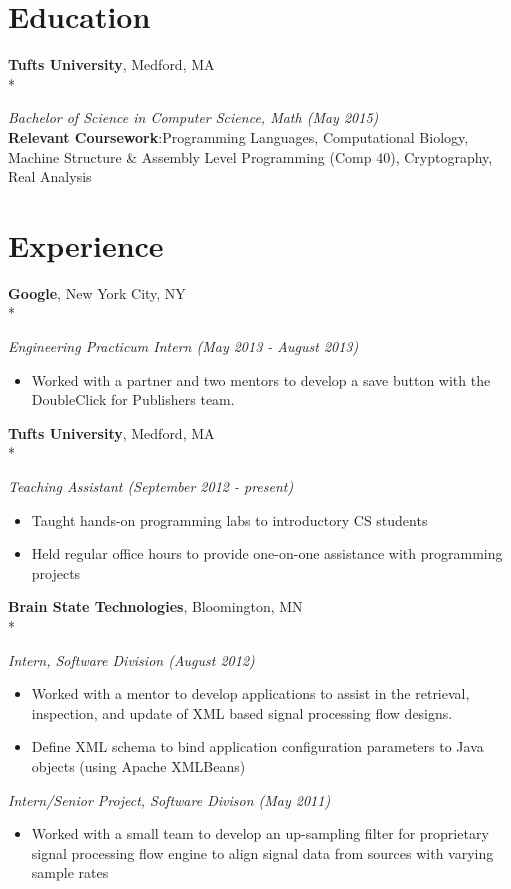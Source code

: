 \documentclass{article}
\newcommand{\position}[2]{
  \textit{#1 (#2)}
}
\newcommand{\affiliation}[2]{
  \textbf{#1}, #2 \\*
}
\newenvironment{achievements}{
  \begin{itemize}
  \setlength{\topsep}{0pt}
  \setlength{\itemsep}{1pt}
  \setlength{\parsep}{0pt}
  }{
  \end{itemize}
}
\newcommand{\skill}[2]{
  \textbf{#1}:#2
}
\begin{document}
\section{Education}
  \affiliation{Tufts University}
              {Medford, MA}
    \position{Bachelor of Science in Computer Science, Math}
             {May 2015} \\
  \skill{Relevant Coursework}
        {Programming Languages, Computational Biology, Machine Structure \&
        Assembly Level Programming (Comp 40), Cryptography, Real Analysis}

\section{Experience}
  \affiliation{Google}
              {New York City, NY}
    \position {Engineering Practicum Intern}
              {May 2013 - August 2013}
    \begin{achievements}
      \item Worked with a partner and two mentors to develop a save button with 
            the DoubleClick for Publishers team.
    \end{achievements}

  \affiliation{Tufts University}
              {Medford, MA}
    \position {Teaching Assistant}
              {September 2012 - present}
    \begin{achievements}
      \item Taught hands-on programming labs to introductory CS students
      \item Held regular office hours to provide one-on-one assistance with
            programming projects
    \end{achievements}

  \affiliation{Brain State Technologies}
              {Bloomington, MN}
    \position {Intern, Software Division}
              {August 2012}
    \begin{achievements}
      \item Worked with a mentor to develop applications to assist in the
            retrieval, inspection, and update of XML based signal processing 
            flow designs.
      \item Define XML schema to bind application configuration parameters to 
            Java objects (using Apache XMLBeans)
    \end{achievements}

    \position {Intern/Senior Project, Software Divison}
              {May 2011}
    \begin{achievements}
      \item Worked with a small team to develop an up-sampling filter for
      proprietary signal processing flow engine to align signal data from sources
      with varying sample rates
    \end{achievements}
\end{document}
